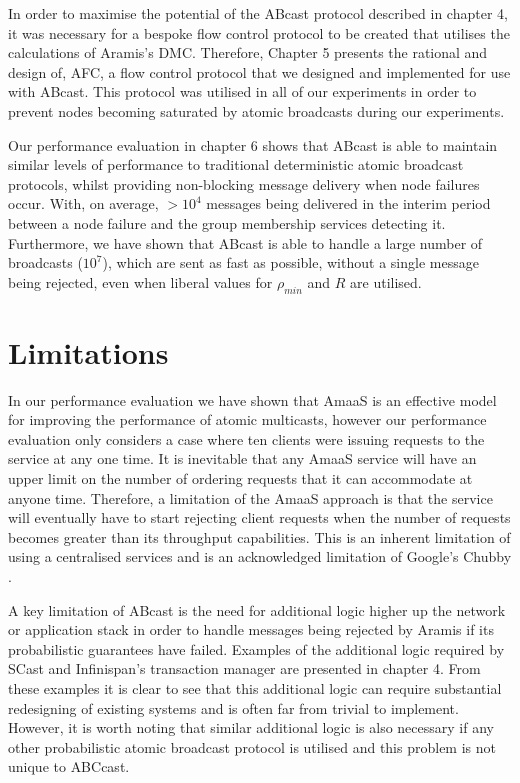 In order to maximise the potential of the \textsf{ABcast} protocol described in chapter 4, it was necessary for a bespoke flow control protocol to be created that utilises the calculations of \textsf{Aramis}'s DMC.  Therefore, Chapter 5 presents the rational and design of, \textsf{AFC}, a flow control protocol that we designed and implemented for use with \textsf{ABcast}.  This protocol was utilised in all of our experiments in order to prevent nodes becoming saturated by atomic broadcasts during our experiments.  

Our performance evaluation in chapter 6 shows that \textsf{ABcast} is able to maintain similar levels of performance to traditional deterministic atomic broadcast protocols, whilst providing non-blocking message delivery when node failures occur.  With, on average, $> 10^4$ messages being delivered in the interim period between a node failure and the group membership services detecting it.  Furthermore, we have shown that \textsf{ABcast} is able to handle a large number of broadcasts ($10^7$), which are sent as fast as possible, without a single message being rejected, even when liberal values for $\rho_{min}$ and $R$ are utilised.  

\section{Limitations}\label{sec:sum_limitations}
In our performance evaluation we have shown that \textsf{AmaaS} is an effective model for improving the performance of atomic multicasts, however our performance evaluation only considers a case where ten clients were issuing requests to the service at any one time.  It is inevitable that any \textsf{AmaaS} service will have an upper limit on the number of ordering requests that it can accommodate at anyone time.  Therefore, a limitation of the \textsf{AmaaS} approach is that the service will eventually have to start rejecting client requests when the number of requests becomes greater than its throughput capabilities.  This is an inherent limitation of using a centralised services and is an acknowledged limitation of Google's Chubby \citep{Burrows:2006:CLS:1298455.1298487}.  

A key limitation of \textsf{ABcast} is the need for additional logic higher up the network or application stack in order to handle messages being rejected by \textsf{Aramis} if its probabilistic guarantees have failed.  Examples of the additional logic required by \textsf{SCast} and Infinispan's transaction manager are presented in chapter 4.  From these examples it is clear to see that this additional logic can require substantial redesigning of existing systems and is often far from trivial to implement.  However, it is worth noting that similar additional logic is also necessary if any other probabilistic atomic broadcast protocol is utilised and this problem is not unique to \textsf{ABCcast}.  

